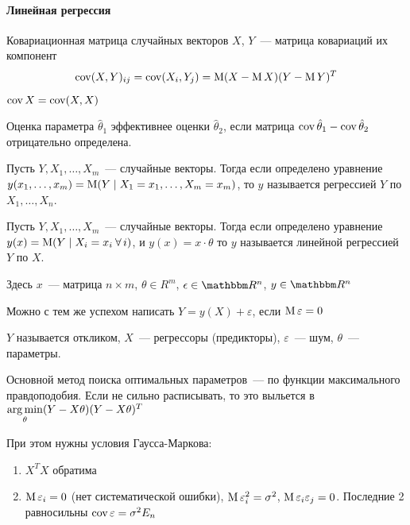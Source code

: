 \documentclass[12pt,ebook]{../../../notes}
\begin{document}
\paragraph{Линейная регрессия}
\label{par:stat::regr}

\begin{defn}\label{defn:stat::reg::cov2}
  Ковариационная матрица случайных векторов $X$, $Y$~--- матрица ковариаций их компонент
  \[
    \operatorname{cov} (X,Y)_{ij} = \operatorname{cov} (X_i, Y_j) = \operatorname{M} (X-\operatorname{M} X) (Y - \operatorname{M} Y)^T
  \]
\end{defn}
\begin{defn}\label{defn:stat::reg::cov}
  $\operatorname{cov} X = \operatorname{cov} (X,X)$
\end{defn}

\begin{defn}\label{defn:stat::reg::eff}
  Оценка параметра $\hat\theta_1$ эффективнее оценки $\hat\theta_2$, если матрица $\operatorname{cov}
  \hat\theta_1 - \operatorname{cov} \hat\theta_2$ отрицательно определена.
\end{defn}

\begin{defn}[Регрессия]\label{defn:stat::regr::reg}
  Пусть $Y, X_1, \dotsc, X_m$~--- случайные векторы. 
  Тогда если определено уравнение $y(x_1, \dotsc, x_m) = \operatorname{M} (Y \mid X_1 = x_1, \dotsc, X_m =
  x_m)$,  то $y$ называется регрессией $Y$ по $X_1, \dotsc, X_n$.
\end{defn}

\begin{defn}\label{defn:stat::regr::lin}
  Пусть $Y, X_1, \dotsc, X_m$~--- случайные векторы. 
  Тогда если определено уравнение $y(x) = \operatorname{M} (Y \mid X_i =  x_i \:\forall\, i)$, 
  и $y(x) = x\cdot\theta $ то $y$ называется линейной регрессией $Y$ по $X$.

  Здесь $x$~--- матрица $n\times m$, $\theta\in R^m$, $\epsilon\in \R^n$, $y\in \R^n$
\end{defn}
\begin{rem}\label{rem:stat::regr::funran}
  Можно с тем же успехом написать $Y = y(X)+ \varepsilon$, если $\operatorname{M} \varepsilon =0$
\end{rem}

\begin{defn}\label{defn:stat::reg::memb}
  $Y$ называется откликом, $X$~--- регрессоры (предикторы), $\varepsilon$~--- шум, $\theta$~---
  параметры.
\end{defn}

Основной метод поиска оптимальных параметров~--- по  функции максимального правдоподобия. Если не
сильно расписывать, то это выльется в $\operatorname*{arg\,min}\limits_{\theta} (Y-X\theta)(Y-X\theta)^T$

При этом нужны условия Гаусса-Маркова:
\begin{enumerate}
  \item $X^T X$ обратима
  \item $\operatorname{M} \varepsilon_i =0$ (нет систематической ошибки), $\operatorname{M} \varepsilon_i^2 = \sigma^2$,
    $\operatorname{M} \varepsilon_i\varepsilon_j= 0$. Последние 2 равносильны $\operatorname{cov}\varepsilon = \sigma^2 E_n$
\end{enumerate}
\end{document}
